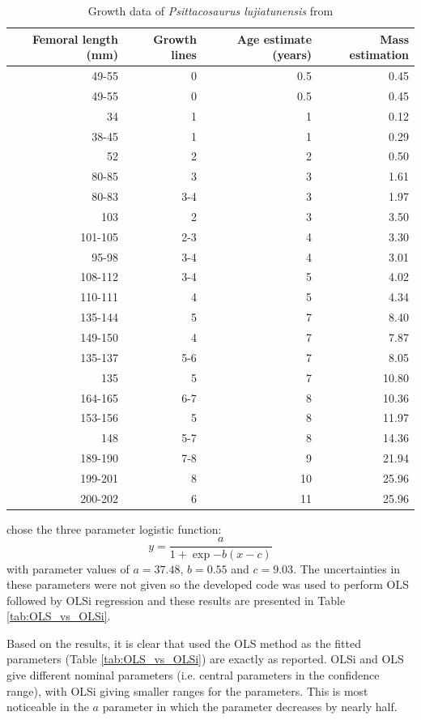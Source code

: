 \documentclass[12pt,a4paper]{article}
\begin{document}
 
\begin{table}
	\centering
	\begin{tabular}{r r r r}
		\hline
		Femoral length (mm) & Growth lines  & Age estimate (years) & Mass estimation\\
		\hline
		49-55 & 0 & 0.5 & 0.45\\
		49-55 & 0 & 0.5 & 0.45\\
		34 & 1 & 1 & 0.12\\ 
		38-45 & 1 &1& 0.29\\
		52 & 2 & 2 &0.50\\
		80-85 & 3 &3&1.61\\
		80-83 &3-4 &3&1.97\\
		103 & 2 & 3 &3.50\\
		101-105 & 2-3 & 4&3.30\\
		95-98 &  3-4 & 4&3.01\\
		108-112 & 3-4&5&4.02\\
		110-111 & 4 & 5&4.34\\
		135-144 & 5 & 7&8.40\\
		149-150&4&7&7.87\\
		135-137&5-6&7&8.05\\
		135 & 5 &7&10.80\\
		164-165&6-7&8&10.36\\
		153-156&5&8&11.97\\
		148&5-7&8&14.36\\
		189-190&7-8&9&21.94\\
		199-201&8&10&25.96\\
		200-202&6&11&25.96\\
		
		\hline
	\end{tabular}
	\caption{Growth data of \emph{Psittacosaurus lujiatunensis} from \textcite{Erickson2015}}\label{tab:Growth_data_dino}
\end{table}

\textcite{Erickson2015} chose the three parameter logistic function:
\begin{equation}\label{eq:logistic}
y = \frac{a}{1+\exp{-b(x-c)}}
\end{equation}
with parameter values of $a=37.48$, $b=0.55$ and $c=9.03$. The uncertainties in these parameters were not given so the developed code was used to perform OLS followed by OLSi regression and these results are presented in Table \ref{tab:OLS_vs_OLSi}.

Based on the results, it is clear that \textcite{Erickson2015} used the OLS method as the fitted parameters (Table \ref{tab:OLS_vs_OLSi}) are exactly as reported. OLSi and OLS give different nominal parameters (i.e. central parameters in the confidence range), with OLSi giving smaller ranges for the parameters. This is most noticeable in the $a$ parameter in which the parameter decreases by nearly half. 
\end{document}
